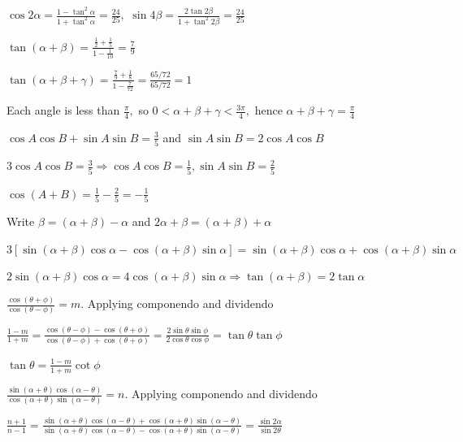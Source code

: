   $\cos 2\alpha = \frac{1 - \tan^2\alpha}{1 + \tan^2\alpha} = \frac{24}{25},$ $\sin 4\beta = \frac{2\tan 2\beta}{1 +
  \tan^2 2\beta} = \frac{24}{25}$

\item $\tan(\alpha + \beta) = \frac{\frac{1}{2} + \frac{1}{5}}{1 - \frac{1}{10}} = \frac{7}{9}$

  $\tan(\alpha + \beta + \gamma) = \frac{\frac{7}{9} + \frac{1}{8}}{1 - \frac{7}{72}} = \frac{65/72}{65/72} = 1$

  Each angle is less than $\frac{\pi}{4},$ so $0 < \alpha + \beta + \gamma < \frac{3\pi}{4},$ hence $\alpha + \beta +
  \gamma = \frac{\pi}{4}$

\item $\cos A\cos B + \sin A\sin B = \frac{3}{5}$ and $\sin A\sin B = 2\cos A\cos B$

  $3\cos A\cos B = \frac{3}{5} \Rightarrow \cos A\cos B = \frac{1}{5}, \sin A\sin B = \frac{2}{5}$

  $\cos(A + B) = \frac{1}{5} - \frac{2}{5} = -\frac{1}{5}$

\item Write $\beta = (\alpha + \beta) - \alpha$ and $2\alpha + \beta = (\alpha + \beta) + \alpha$

  $3[\sin(\alpha + \beta)\cos\alpha - \cos(\alpha + \beta)\sin\alpha] = \sin(\alpha + \beta)\cos\alpha + \cos(\alpha +
  \beta)\sin\alpha$

  $2\sin(\alpha + \beta)\cos\alpha = 4\cos(\alpha + \beta)\sin\alpha \Rightarrow \tan(\alpha + \beta) = 2\tan\alpha$

\item $\frac{\cos(\theta + \phi)}{\cos(\theta - \phi)} = m.$ Applying componendo and dividendo

  $\frac{1 - m}{1 + m} = \frac{\cos(\theta - \phi) - \cos(\theta + \phi)}{\cos(\theta - \phi) + \cos(\theta + \phi)} =
  \frac{2\sin\theta\sin\phi}{2\cos\theta\cos\phi} = \tan\theta\tan\phi$

  $\tan\theta = \frac{1 - m}{1 + m}\cot\phi$

\item $\frac{\sin(\alpha + \theta)\cos(\alpha - \theta)}{\cos(\alpha + \theta)\sin(\alpha - \theta)} = n.$ Applying
  componendo and dividendo

  $\frac{n + 1}{n - 1} = \frac{\sin(\alpha + \theta)\cos(\alpha - \theta) + \cos(\alpha + \theta)\sin(\alpha -
  \theta)}{\sin(\alpha + \theta)\cos(\alpha - \theta) - \cos(\alpha + \theta)\sin(\alpha - \theta)} = \frac{\sin
  2\alpha}{\sin 2\theta}$

